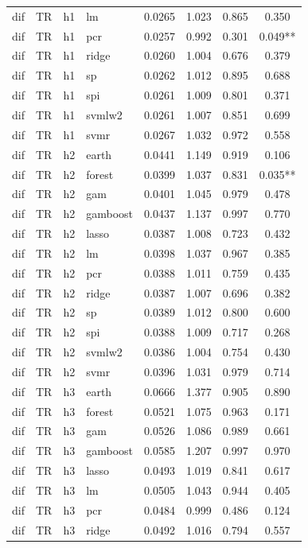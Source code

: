 \begin{ThreePartTable}
\begin{longtable}[t]{llclcccc}
dif & TR & h1 & lm & 0.0265 & 1.023 & 0.865 & 0.350\\
dif & TR & h1 & pcr & 0.0257 & 0.992 & 0.301 & 0.049**\\
dif & TR & h1 & ridge & 0.0260 & 1.004 & 0.676 & 0.379\\
dif & TR & h1 & sp & 0.0262 & 1.012 & 0.895 & 0.688\\
dif & TR & h1 & spi & 0.0261 & 1.009 & 0.801 & 0.371\\
dif & TR & h1 & svmlw2 & 0.0261 & 1.007 & 0.851 & 0.699\\
dif & TR & h1 & svmr & 0.0267 & 1.032 & 0.972 & 0.558\\
\addlinespace
dif & TR & h2 & earth & 0.0441 & 1.149 & 0.919 & 0.106\\
dif & TR & h2 & forest & 0.0399 & 1.037 & 0.831 & 0.035**\\
dif & TR & h2 & gam & 0.0401 & 1.045 & 0.979 & 0.478\\
dif & TR & h2 & gamboost & 0.0437 & 1.137 & 0.997 & 0.770\\
dif & TR & h2 & lasso & 0.0387 & 1.008 & 0.723 & 0.432\\
dif & TR & h2 & lm & 0.0398 & 1.037 & 0.967 & 0.385\\
dif & TR & h2 & pcr & 0.0388 & 1.011 & 0.759 & 0.435\\
dif & TR & h2 & ridge & 0.0387 & 1.007 & 0.696 & 0.382\\
dif & TR & h2 & sp & 0.0389 & 1.012 & 0.800 & 0.600\\
dif & TR & h2 & spi & 0.0388 & 1.009 & 0.717 & 0.268\\
dif & TR & h2 & svmlw2 & 0.0386 & 1.004 & 0.754 & 0.430\\
dif & TR & h2 & svmr & 0.0396 & 1.031 & 0.979 & 0.714\\
\addlinespace
dif & TR & h3 & earth & 0.0666 & 1.377 & 0.905 & 0.890\\
dif & TR & h3 & forest & 0.0521 & 1.075 & 0.963 & 0.171\\
dif & TR & h3 & gam & 0.0526 & 1.086 & 0.989 & 0.661\\
dif & TR & h3 & gamboost & 0.0585 & 1.207 & 0.997 & 0.970\\
dif & TR & h3 & lasso & 0.0493 & 1.019 & 0.841 & 0.617\\
dif & TR & h3 & lm & 0.0505 & 1.043 & 0.944 & 0.405\\
dif & TR & h3 & pcr & 0.0484 & 0.999 & 0.486 & 0.124\\
dif & TR & h3 & ridge & 0.0492 & 1.016 & 0.794 & 0.557\\

\end{longtable}
\end{ThreePartTable}
